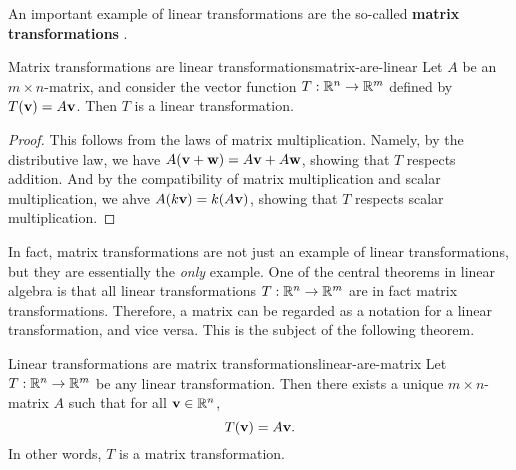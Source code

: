 An important example of linear transformations are the so-called
\textbf{matrix transformations}%
%
.

\begin{proposition}{Matrix transformations are linear transformations}{matrix-are-linear}
  Let $A$ be an $m\times n$-matrix, and consider the vector function
  $T:\mathbb{R}^{n}\to \mathbb{R}^{m}$ defined by $T(\mbox{\bf v}) = A\mbox{\bf v}$. Then $T$
  is a linear transformation.
\end{proposition}

\begin{proof}
  This follows from the laws of matrix multiplication. Namely, by the
  distributive law, we have
  $A(\mbox{\bf v}+\mbox{\bf w}) = A\mbox{\bf v} + A\mbox{\bf w}$, showing that $T$
  respects addition. And by the compatibility of matrix multiplication
  and scalar multiplication, we ahve $A(k\mbox{\bf v}) = k(A\mbox{\bf v})$,
  showing that $T$ respects scalar multiplication.
\end{proof}

In fact, matrix transformations are not just an example of linear
transformations, but they are essentially the {\em only} example. One
of the central theorems in linear algebra is that all linear
transformations $T:\mathbb{R}^n\to\mathbb{R}^m$ are in fact matrix transformations.
Therefore, a matrix can be regarded as a notation for a linear
transformation, and vice versa. This is the subject of the following
theorem.

\begin{theorem}{Linear transformations are matrix transformations}{linear-are-matrix}
  Let $T:\mathbb{R}^n\to\mathbb{R}^m$ be any linear transformation. Then there exists
  a unique $m\times n$-matrix $A$ such that for all $\mbox{\bf v}\in\mathbb{R}^n$,
  \begin{equation*}
    T(\mbox{\bf v}) = A\mbox{\bf v}.
  \end{equation*}
  In other words, $T$ is a matrix transformation.
\end{theorem}

